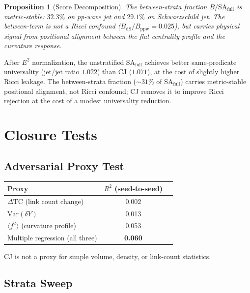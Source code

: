 \documentclass[12pt,a4paper]{article}
\newtheorem{proposition}{Proposition}
\begin{document}
\begin{proposition}[Score Decomposition]\label{prop:gta5}
The between-strata fraction $B/\mathrm{SA}_{\mathrm{full}}$ is metric-stable:
$32.3\%$ on pp-wave jet and $29.1\%$ on Schwarzschild jet.
The between-term is not a Ricci confound ($B_{\mathrm{dS}}/B_{\mathrm{ppw}} = 0.025$), but carries physical signal from positional alignment between the flat centrality profile and the curvature response.
\end{proposition}

\noindent After $E^2$ normalization, the unstratified SA$_{\mathrm{full}}$ achieves better same-predicate universality (jet/jet ratio $1.022$) than CJ ($1.071$), at the cost of slightly higher Ricci leakage. The between-strata fraction ($\sim\!31\%$ of SA$_{\mathrm{full}}$) carries metric-stable positional alignment, not Ricci confound; CJ removes it to improve Ricci rejection at the cost of a modest universality reduction.

\section{Closure Tests}

\subsection{Adversarial Proxy Test}

\begin{center}
\begin{tabular}{lcc}
\toprule
Proxy & $R^2$ (seed-to-seed) \\
\midrule
$\Delta\mathrm{TC}$ (link count change) & 0.002 \\
$\mathrm{Var}(\delta Y)$ & 0.013 \\
$\langle f^2 \rangle$ (curvature profile) & 0.053 \\
Multiple regression (all three) & \textbf{0.060} \\
\bottomrule
\end{tabular}
\end{center}

\noindent CJ is not a proxy for simple volume, density, or link-count statistics.

\subsection{Strata Sweep}
\end{document}
